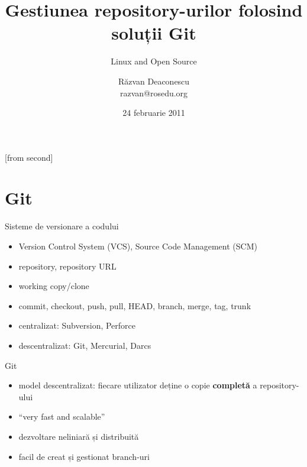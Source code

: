 \documentclass{beamer}
\title[Git Repositories]{Gestiunea repository-urilor folosind soluții Git}
\subtitle{Linux and Open Source}
\author[Răzvan Deaconescu]{Răzvan Deaconescu\\
	razvan@rosedu.org}
\date{24 februarie 2011}
\begin{document}
[from second]


\frame{\titlepage}

\frame{\tableofcontents}

\section{Git}

\begin{frame}{Sisteme de versionare a codului}
	\begin{itemize}		%
		\item Version Control System (VCS), Source Code Management (SCM)
		\item repository, repository URL
        \item working copy/clone
        \item commit, checkout, push, pull, HEAD, branch, merge, tag, trunk
        \item centralizat: Subversion, Perforce
        \item descentralizat: Git, Mercurial, Darcs
	\end{itemize}
\end{frame}

\begin{frame}{Git}
	\begin{itemize}
		\item model descentralizat: fiecare utilizator deține o copie
        \textbf{completă} a repository-ului
		\item ``very fast and scalable''
        \item dezvoltare neliniară și distribuită
        \item facil de creat și gestionat branch-uri
	\end{itemize}
\end{frame}
\end{document}
